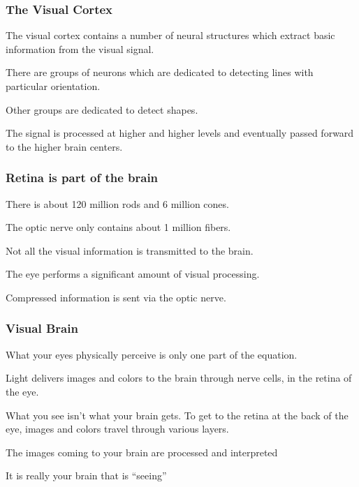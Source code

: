 \documentclass[12pt]{beamer}\usepackage[]{graphicx}\usepackage[]{color}
\begin{document}

\begin{frame}
\frametitle{The Visual Cortex}

\bbi
  \item The visual cortex contains a number of neural structures which extract
  basic information from the visual signal.
  \item There are groups of neurons which are dedicated to detecting lines
  with particular orientation.
  \item Other groups are dedicated to detect shapes.
  \item The signal is processed at higher and higher levels and eventually
  passed forward to the higher brain centers.
\ei

\end{frame}


\begin{frame}
\frametitle{Retina is part of the brain}

\bbi
  \item There is about 120 million rods and 6 million cones.
  \item The optic nerve only contains about 1 million fibers.
  \item Not all the visual information is transmitted to the brain.
  \item The eye performs a significant amount of visual processing.
  \item Compressed information is sent via the optic nerve.
\ei

\end{frame}


\begin{frame}
\frametitle{Visual Brain}

\bbi
  \item What your eyes physically perceive is only one part of the equation.
  \item Light delivers images and colors to the brain through nerve cells,
in the retina of the eye.
  \item What you see isn't what your brain gets. To get to the retina at the back of the eye, images
and colors travel through various layers.
  \item The images coming to your brain are processed and interpreted
  \item It is really your brain that is ``seeing''
\ei

\end{frame}
\end{document}
